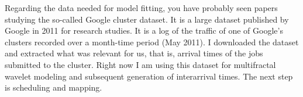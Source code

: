 Regarding the data needed for model fitting, you have probably seen papers
studying the so-called Google cluster dataset. It is a large dataset published
by Google in 2011 for research studies. It is a log of the traffic of one of
Google's clusters recorded over a month-time period (May 2011). I downloaded the
dataset and extracted what was relevant for us, that is, arrival times of the
jobs submitted to the cluster. Right now I am using this dataset for
multifractal wavelet modeling and subsequent generation of interarrival times.
The next step is scheduling and mapping.
